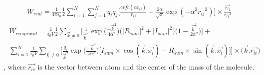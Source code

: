 \documentclass[letterpaper,10pt,english]{sphinxmanual}
\begin{document}
\begin{description}
\begin{equation*}
\begin{split}W_{real} = \frac{1}{4\pi \epsilon_0} \frac{1}{2} \sum_{i =1}^{N} \sum_{j = 1}^{N} q_i q_j  \bigg[ \frac{erfc(\alpha r_{ij})}{r_{ij}} + \frac{2\alpha}{ \sqrt{\pi}} \exp(-\alpha^2 {r_{ij}}^2) \bigg] \times \frac{\overrightarrow{r_{ij}}}{{r_{ij}}^2}\end{split}
\end{equation*}\begin{equation*}
\begin{split}\begin{split}
              W_{reciprocal} = \frac{1}{\epsilon_0 V} \frac {1}{2} \sum_{\overrightarrow{k} \ne 0}^{} \Bigg[\frac {1}{\overrightarrow{k}^2}\exp\bigg(\frac {-\overrightarrow{k}^2}{4 \alpha^2}\bigg) \bigg( {\Big| R_{sum} \Big|}^2 + {\Big| I_{sum} \Big|}^2 \bigg) \bigg(  1 - \frac{\overrightarrow{k}^2}{2\alpha^2} \bigg) \Bigg] +\\
  \sum_{i=1}^{N} \frac{1}{\epsilon_0 V}  \sum_{\overrightarrow{k} \ne 0}^{} \Bigg[ \frac {q_i}{\overrightarrow{k}^2}\exp\bigg(\frac {-\overrightarrow{k}^2}{4 \alpha^2}\bigg) \bigg[ I_{sum} \times\cos(\overrightarrow{k}.\overrightarrow{x_i})  - R_{sum} \times \sin(\overrightarrow{k}.\overrightarrow{x_i}) \bigg] \Bigg] \times \big( \overrightarrow{k}.\overrightarrow{r_{ic}} \big)
      \end{split}\end{split}
\end{equation*}
, where \(\overrightarrow{r_{ic}}\) is the vector between atom and the center of the mass of the molecule.

\end{description}
\end{document}
